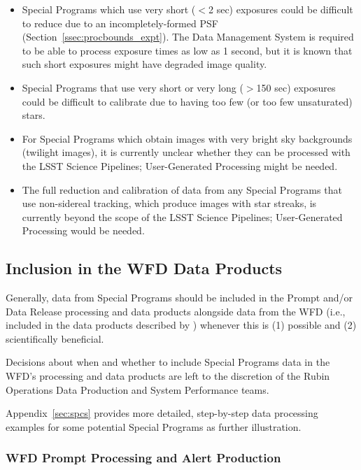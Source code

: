 \begin{itemize}

\item Special Programs which use very short ($<$2 sec) exposures 
could be difficult to reduce due to an incompletely-formed PSF 
(Section~\ref{ssec:procbounds_expt}).
The Data Management System is required to be able to process exposure 
times as low as 1 second, but it is known that such short exposures might 
have degraded image quality.

\item Special Programs that use very short or very long ($>$150 sec) 
exposures could be difficult to calibrate due to having too few 
(or too few unsaturated) stars.

\item For Special Programs which obtain images with very bright sky backgrounds
(twilight images), it is currently unclear whether they can be processed
with the LSST Science Pipelines; User-Generated Processing might be needed.

\item The full reduction and calibration of data from any Special Programs that 
use non-sidereal tracking, which produce images with star streaks, is
currently beyond the scope of the LSST Science Pipelines; 
User-Generated Processing would be needed.

\end{itemize}


\subsection{Inclusion in the WFD Data Products}\label{ssec:proc_wfd}

Generally, data from Special Programs should be included in the Prompt 
and/or Data Release processing and data products alongside data from the 
WFD (i.e., included in the data products described by ) 
whenever this is (1) possible and (2) scientifically beneficial.

Decisions about when and whether to include Special Programs data in 
the WFD's processing and data products are left to the discretion of the 
Rubin Operations Data Production and System Performance teams.

Appendix~\ref{sec:spcs} provides more detailed, step-by-step data processing 
examples for some potential Special Programs as further illustration. 


\subsubsection{WFD Prompt Processing and Alert Production}

